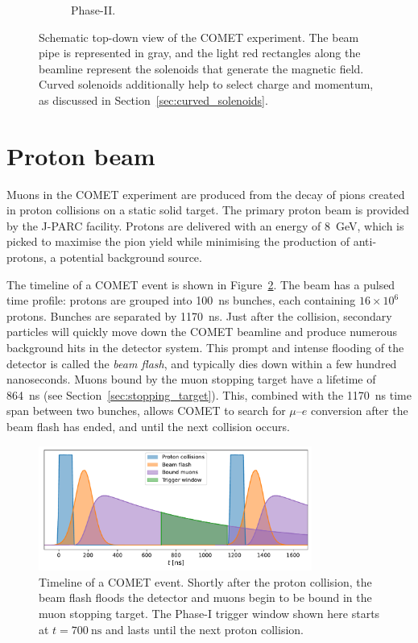 \begin{figure}
\begin{subfigure}[b]{0.49\textwidth}
        \caption{Phase-II.}
    \end{subfigure}
    \caption{ Schematic top-down view of the COMET experiment. The beam pipe is
    represented in gray, and the light red rectangles along the beamline
    represent the solenoids that generate the magnetic field. Curved solenoids
    additionally help to select charge and momentum, as discussed in
    Section~\ref{sec:curved_solenoids}.}
    \label{fig:comet_schematic}
\end{figure}



\section{Proton beam}\label{sec:COMET_beam}

Muons in the COMET experiment are produced from the decay of pions created in
proton collisions on a static solid target. The primary proton beam is provided
by the J-PARC facility. Protons are delivered with an energy of \SI{8}{\GeV},
which is picked to maximise the pion yield while minimising the production of
anti-protons, a potential background source.

The timeline of a COMET event is shown in Figure~\ref{fig:timing_distributions}.
The beam has a pulsed time profile: protons are grouped into \SI{100}{\ns}
bunches, each containing $16\times 10^6$ protons. Bunches are separated by
\SI{1170}{\ns}. Just after the collision, secondary particles will quickly move
down the COMET beamline and produce numerous background hits in the detector
system. This prompt and intense flooding of the detector is called the
\emph{beam flash}, and typically dies down within a few hundred nanoseconds.
Muons bound by the muon stopping target have a lifetime of \SI{864}{\ns} (see
Section~\ref{sec:stopping_target}). This, combined with the \SI{1170}{\ns} time
span between two bunches, allows COMET to search for $\mu$--$e$ conversion after
the beam flash has ended, and until the next collision occurs. 

\begin{figure}
    \centering
    \includegraphics[width=0.8\textwidth]{chapter2/timing_plot.pdf}
    \caption{ Timeline of a COMET event. Shortly after the proton collision, the
        beam flash floods the detector and muons begin to be bound in the muon
        stopping target. The Phase-I trigger window shown here starts at
        $t=\SI{700}{\ns}$ and lasts until the next proton collision.  }
    \label{fig:timing_distributions}
\end{figure}


